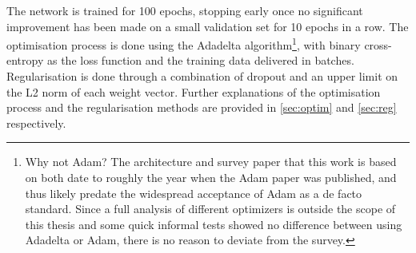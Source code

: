 The network is trained for 100 epochs, stopping early once no significant
improvement has been made on a small validation set for 10 epochs in a row. The
optimisation process is done using the Adadelta\citep{adadelta}
algorithm\footnote{Why not Adam\citep{adam}? The architecture\citep{kim2014conv}
and survey paper\citep{zhang2015conv} that this work is based on both date to
roughly the year when the Adam paper was published, and thus likely predate the
widespread acceptance of Adam as a de facto standard. Since a full analysis of
different optimizers is outside the scope of this thesis and some quick informal
tests showed no difference between using Adadelta or Adam, there is no reason to
deviate from the survey.}, with binary cross-entropy as the loss function and
the training data delivered in batches. Regularisation is done through a
combination of dropout\citep{dropout} and an upper limit on the L2 norm of each
weight vector\citep{l2norm}. Further explanations of the optimisation process
and the regularisation methods are provided in \cref{sec:optim} and
\cref{sec:reg} respectively.

